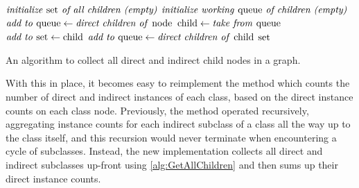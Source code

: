 \begin{algorithm}
  \begin{algorithmic}
    \State $\text{\textit{initialize \textup{set} of all children (empty)}}$
    \State $\text{\textit{initialize working \textup{queue} of children (empty)}}$
    \State $\text{\textit{add to \textup{queue}}} \gets \text{\textit{direct children of \textup{node}}}$
    \State $\textup{child} \gets \text{\textit{take from \textup{queue}}}$
    \State $\text{\textit{add to \textup{set}}} \gets \textup{child}$
    \State $\text{\textit{add to \textup{queue}}} \gets \text{\textit{direct children of \textup{child}}}$
    \EndIf
    \EndWhile
    \State \Return $\text{\textit{\textup{set}}}$
    \EndFunction
  \end{algorithmic}
  \caption{An algorithm to collect all direct and indirect child nodes in a graph.}
  \label{alg:GetAllChildren}
\end{algorithm}

With this in place,
it becomes easy to reimplement the method which counts the number of direct and indirect instances of each class,
based on the direct instance counts on each class node.
Previously, the method operated recursively,
aggregating instance counts for each indirect subclass of a class
all the way up to the class itself,
and this recursion would never terminate when encountering a cycle of subclasses.
Instead, the new implementation collects all direct and indirect subclasses up-front using \cref{alg:GetAllChildren}
and then sums up their direct instance counts.

